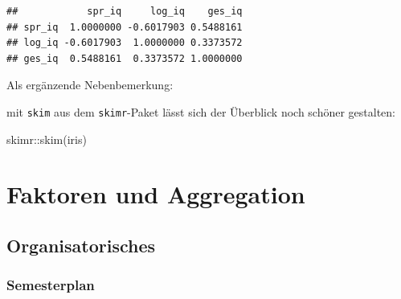 \documentclass[
]{book}
\newenvironment{Shaded}{\begin{snugshade}}{\end{snugshade}}
\newcommand{\FunctionTok}[1]{\textcolor[rgb]{0.00,0.00,0.00}{#1}}
\newcommand{\NormalTok}[1]{#1}
\newcommand{\SpecialCharTok}[1]{\textcolor[rgb]{0.00,0.00,0.00}{#1}}
\begin{document}
\begin{verbatim}
##            spr_iq     log_iq    ges_iq
## spr_iq  1.0000000 -0.6017903 0.5488161
## log_iq -0.6017903  1.0000000 0.3373572
## ges_iq  0.5488161  0.3373572 1.0000000
\end{verbatim}

Als ergänzende Nebenbemerkung:

mit \texttt{skim} aus dem \texttt{skimr}-Paket lässt sich der Überblick noch schöner gestalten:

\begin{Shaded}
\begin{Highlighting}[]
\NormalTok{skimr}\SpecialCharTok{::}\FunctionTok{skim}\NormalTok{(iris)}
\end{Highlighting}
\end{Shaded}

\hypertarget{faktoren-und-aggregation}{%
\chapter{Faktoren und Aggregation}\label{faktoren-und-aggregation}}

\hypertarget{organisatorisches-3}{%
\section{Organisatorisches}\label{organisatorisches-3}}

\hypertarget{semesterplan-4}{%
\subsection{Semesterplan}\label{semesterplan-4}}
\end{document}
